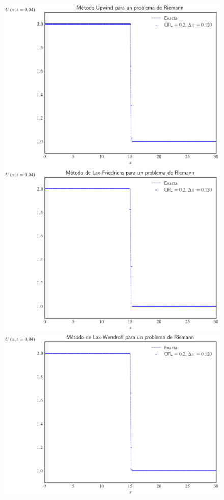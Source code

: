 \begin{frame}
    \frametitle{\secname}

    \begin{figure}[ht!]
        \centering
        \includegraphics[width=.30\paperwidth]{../snapshots/upwindheaviside1d-2.png}
        \includegraphics[width=.30\paperwidth]{../snapshots/lax-friedrichsheaviside1d-2.png}
        \includegraphics[width=.30\paperwidth]{../snapshots/lax-wendroffheaviside1d-2.png}

\end{figure}
\end{frame}

